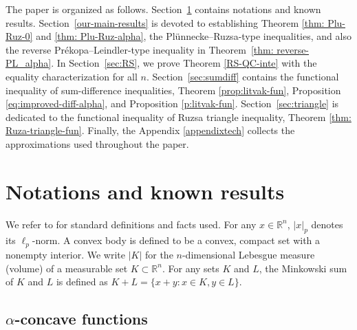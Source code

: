 \documentclass[11pt]{amsart}
\newcommand{\R}{{\mathbb R}}
\theoremstyle{plain}
\theoremstyle{definition}
\theoremstyle{remark}
\begin{document}
\par\vspace{.2in}
The paper is organized as follows. Section~\ref{previous-results} contains notations and known results. Section~\ref{our-main-results} is devoted to establishing Theorem \ref{thm: Plu-Ruz-0} and \ref{thm: Plu-Ruz-alpha}, the Pl\"unnecke--Ruzsa-type inequalities, and also the reverse Pr\'ekopa--Leindler-type inequality in Theorem~\ref{thm: reverse-PL_alpha}. In Section~\ref{sec:RS}, we prove Theorem \ref{RS-QC-inte} with the equality characterization for all $n$. Section~\ref{sec:sumdiff} contains the functional inequality of sum-difference inequalities, Theorem \ref{prop:litvak-fun}, Proposition \ref{eq:improved-diff-alpha}, and Proposition \ref{p:litvak-fun}. Section~\ref{sec:triangle} is dedicated to the functional inequality of Ruzsa triangle inequality, Theorem \ref{thm: Ruza-triangle-fun}. Finally, the Appendix \ref{appendixtech} collects the approximations used throughout the paper.



\section{Notations and known results}\label{previous-results}


We refer to \cite{S-14} for standard definitions and facts used. For any $x \in \R^n$, $|x|_p$ denotes its $\ell_p$-norm. A convex body is defined to be a convex, compact set with a nonempty interior.
We write $ |K| $ for the $n$-dimensional Lebesgue measure (volume) of a measurable set $K\subset \R^n$. For any sets $K$ and $L$, the Minkowski sum of $K $ and $ L$ is defined as $K+L = \{ x+y : x\in K, y \in L \}$.


\subsection{\texorpdfstring{$\alpha$}{α}-concave functions} \label{section: alpha-concave}
\end{document}
